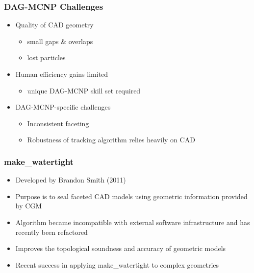 \documentclass[14pt]{beamer}
\begin{document}
\begin{frame}
\frametitle{DAG-MCNP Challenges}
\begin{itemize}
\vfill

\item Quality of CAD geometry
	\begin{itemize}
	\color{red}
	\item small gaps \& overlaps
	\item lost particles
	\end{itemize}
\vfill
\item Human efficiency gains limited
	\begin{itemize}
	\item unique DAG-MCNP skill set required	
	\end{itemize}
\vfill
\item DAG-MCNP-specific challenges
	\begin{itemize}
	\item Inconsistent faceting
	\item Robustness of tracking algorithm relies heavily on CAD
	\end{itemize}
\end{itemize}
\end{frame}



\begin{frame}
\frametitle{make\_watertight}
\begin{itemize}
\item Developed by Brandon Smith (2011)
\item Purpose is to seal faceted CAD models using geometric information provided by CGM
\item Algorithm became incompatible with external software infrastructure and has recently been refactored
\item Improves the topological soundness and accuracy of geometric models
\item Recent success in applying make\_watertight to complex geometries
\end{itemize}
\end{frame}
\end{document}
